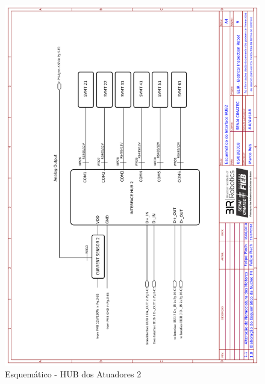 	
    \begin{figure}[h]
	\centering
	\includegraphics[width=14cm]{Figures/EsquematicoHUB2.png}
	\caption{Esquemático - HUB dos Atuadores 2} \label{HUB2}
	\end{figure}
	
	\pagebreak

